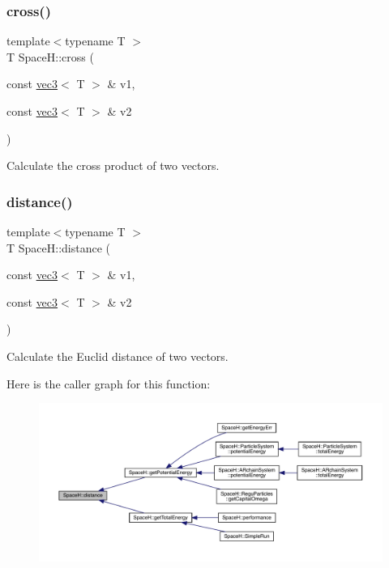 \subsubsection{\texorpdfstring{cross()}{cross()}\hspace{0.1cm}{\footnotesize\ttfamily [2/2]}}
{\footnotesize\ttfamily template$<$typename T $>$ \\
T Space\+H\+::cross (\begin{DoxyParamCaption}\item[{const \mbox{\hyperlink{struct_space_h_1_1vec3}{vec3}}$<$ T $>$ \&}]{v1,  }\item[{const \mbox{\hyperlink{struct_space_h_1_1vec3}{vec3}}$<$ T $>$ \&}]{v2 }\end{DoxyParamCaption})\hspace{0.3cm}{\ttfamily [inline]}}



Calculate the cross product of two vectors. 

\mbox{\label{namespace_space_h_a889a97546c28125c77c00557ab96b496}} 
\subsubsection{\texorpdfstring{distance()}{distance()}}
{\footnotesize\ttfamily template$<$typename T $>$ \\
T Space\+H\+::distance (\begin{DoxyParamCaption}\item[{const \mbox{\hyperlink{struct_space_h_1_1vec3}{vec3}}$<$ T $>$ \&}]{v1,  }\item[{const \mbox{\hyperlink{struct_space_h_1_1vec3}{vec3}}$<$ T $>$ \&}]{v2 }\end{DoxyParamCaption})\hspace{0.3cm}{\ttfamily [inline]}}



Calculate the Euclid distance of two vectors. 

Here is the caller graph for this function\+:
\nopagebreak
\begin{figure}[H]
\begin{center}
\leavevmode
\includegraphics[width=350pt]{namespace_space_h_a889a97546c28125c77c00557ab96b496_icgraph}
\end{center}
\end{figure}
\mbox{\label{namespace_space_h_a8a469adb735b3a1d5c15b4a97278ad51}} 
